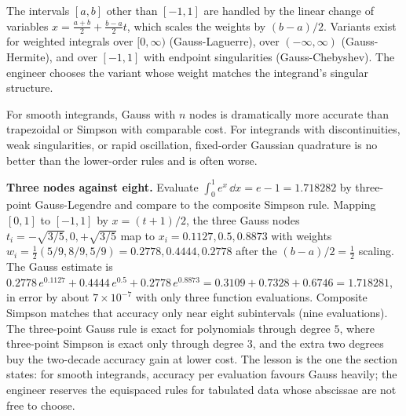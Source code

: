 The intervals $[a, b]$ other than $[-1, 1]$ are handled by the
linear change of variables $x = \frac{a+b}{2} + \frac{b-a}{2} t$,
which scales the weights by $(b-a)/2$. Variants exist for
weighted integrals over $[0, \infty)$ (Gauss-Laguerre), over
$(-\infty, \infty)$ (Gauss-Hermite), and over $[-1, 1]$ with
endpoint singularities (Gauss-Chebyshev). The engineer chooses
the variant whose weight matches the integrand's singular
structure.

For smooth integrands, Gauss with $n$ nodes is dramatically more
accurate than trapezoidal or Simpson with comparable cost. For
integrands with discontinuities, weak singularities, or rapid
oscillation, fixed-order Gaussian quadrature is no better than
the lower-order rules and is often worse.

\begin{example}
\textbf{Three nodes against eight.} Evaluate $\int_{0}^{1} e^{x}\,
\dd x = e - 1 = 1.718282$ by three-point Gauss-Legendre and compare
to the composite Simpson rule. Mapping $[0, 1]$ to $[-1, 1]$ by
$x = (t + 1)/2$, the three Gauss nodes $t_{i} = -\sqrt{3/5}, 0,
+\sqrt{3/5}$ map to $x_{i} = 0.1127, 0.5, 0.8873$ with weights
$w_{i} = \tfrac{1}{2}(5/9, 8/9, 5/9) = 0.2778, 0.4444, 0.2778$ after
the $(b-a)/2 = \tfrac{1}{2}$ scaling. The Gauss estimate is
$0.2778\, e^{0.1127} + 0.4444\, e^{0.5} + 0.2778\, e^{0.8873} =
0.3109 + 0.7328 + 0.6746 = 1.718281$, in error by about $7 \times
10^{-7}$ with only three function evaluations. Composite Simpson
matches that accuracy only near eight subintervals (nine
evaluations). The three-point Gauss rule is exact for polynomials
through degree $5$, where three-point Simpson is exact only through
degree $3$, and the extra two degrees buy the two-decade accuracy
gain at lower cost. The lesson is the one the section states: for
smooth integrands, accuracy per evaluation favours Gauss heavily;
the engineer reserves the equispaced rules for tabulated data whose
abscissae are not free to choose.
\end{example}

